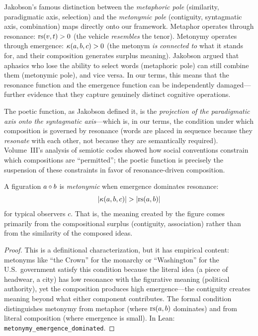 \begin{remark}
\label{rem:jakobson-axis}
Jakobson's famous distinction between the \emph{metaphoric pole} (similarity, paradigmatic axis, selection) and the \emph{metonymic pole} (contiguity, syntagmatic axis, combination) maps directly onto our framework.  Metaphor operates through resonance: $\mathrm{rs}(v, t) > 0$ (the vehicle \emph{resembles} the tenor).  Metonymy operates through emergence: $\kappa(a, b, c) > 0$ (the metonym \emph{is connected to} what it stands for, and their composition generates surplus meaning).  Jakobson argued that aphasics who lose the ability to select words (metaphoric pole) can still combine them (metonymic pole), and vice versa.  In our terms, this means that the resonance function and the emergence function can be independently damaged---further evidence that they capture genuinely distinct cognitive operations.

The poetic function, as Jakobson defined it, is the \emph{projection of the paradigmatic axis onto the syntagmatic axis}---which is, in our terms, the condition under which composition is governed by resonance (words are placed in sequence because they \emph{resonate} with each other, not because they are semantically required).  Volume~III's analysis of semiotic codes showed how social conventions constrain which compositions are ``permitted''; the poetic function is precisely the suspension of these constraints in favor of resonance-driven composition.
\end{remark}

\begin{theorem}
\label{thm:metonymy-emergence}
A figuration $a \circ b$ is \emph{metonymic} when emergence dominates resonance:
\[
  |\kappa(a, b, c)| > |\mathrm{rs}(a, b)|
\]
for typical observers $c$.  That is, the meaning created by the figure comes primarily from the compositional surplus (contiguity, association) rather than from the similarity of the composed ideas.
\end{theorem}

\begin{proof}
This is a definitional characterization, but it has empirical content: metonyms like ``the Crown'' for the monarchy or ``Washington'' for the U.S.\ government satisfy this condition because the literal idea (a piece of headwear, a city) has low resonance with the figurative meaning (political authority), yet the composition produces high emergence---the contiguity creates meaning beyond what either component contributes.  The formal condition distinguishes metonymy from metaphor (where $\mathrm{rs}(a, b)$ dominates) and from literal composition (where emergence is small).  In Lean: \texttt{metonymy\_emergence\_dominated}.
\end{proof}

